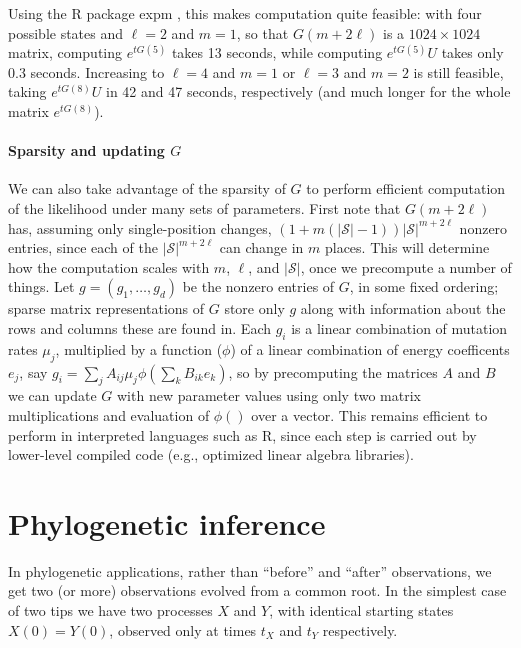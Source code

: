 \documentclass{article}
\newcommand{\calS}{\mathcal{S}}  %
\theoremstyle{plain}
\theoremstyle{definition}
\begin{document}
Using the R package expm \citep{R_expm}, this makes computation quite feasible:
with four possible states and $\ell=2$ and $m=1$, so that $G(m+2\ell)$ is a $1024 \times 1024$ matrix,
computing $e^{t G(5) }$ takes 13 seconds, while computing $e^{t G(5)} U$ takes only 0.3 seconds.
Increasing to $\ell=4$ and $m=1$ or $\ell=3$ and $m=2$ is still feasible, taking $e^{t G(8)} U$ in 42 and 47 seconds, respectively
(and much longer for the whole matrix $e^{t G(8)}$).

\paragraph{Sparsity and updating $G$}
We can also take advantage of the sparsity of $G$ to perform efficient computation of the likelihood
under many sets of parameters.
First note that $G(m+2\ell)$ has, assuming only single-position changes,
$(1+m(|\calS|-1)) |\calS|^{m+2\ell}$ nonzero entries, since each of the $|\calS|^{m+2\ell}$ can change in $m$ places.
This will determine how the computation scales with $m$, $\ell$, and $|\calS|$,
once we precompute a number of things.
Let $g = (g_1, \ldots, g_d)$ be the nonzero entries of $G$, in some fixed ordering;
sparse matrix representations of $G$ store only $g$ along with information about the rows and columns these are found in.
Each $g_i$ is a linear combination of mutation rates $\mu_j$,
multiplied by a function ($\phi$) of a linear combination of energy coefficents $e_j$, 
say $g_i = \sum_j A_{ij} \mu_j \phi(\sum_k B_{ik} e_k)$,
so by precomputing the matrices $A$ and $B$ we can update $G$ with new parameter values
using only two matrix multiplications and evaluation of $\phi()$ over a vector.
This remains efficient to perform in interpreted languages such as R,
since each step is carried out by lower-level compiled code (e.g., optimized linear algebra libraries).

\section{Phylogenetic inference}

In phylogenetic applications, rather than ``before'' and ``after'' observations,
we get two (or more) observations evolved from a common root.
In the simplest case of two tips we have two processes $X$ and $Y$,
with identical starting states $X(0)=Y(0)$,
observed only at times $t_X$ and $t_Y$ respectively.
\end{document}
